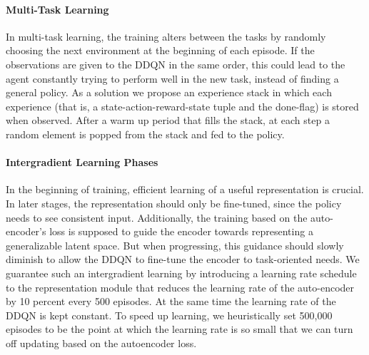 \paragraph{Multi-Task Learning} In multi-task learning, the training alters between the tasks by randomly choosing the next environment at the beginning of each episode. If the observations are given to the DDQN in the same order, this could lead to the agent constantly trying to perform well in the new task, instead of finding a general policy. As a solution we propose an experience stack in which each experience (that is, a state-action-reward-state tuple and the done-flag) is stored when observed. After a warm up period that fills the stack, at each step a random element is popped from the stack and fed to the policy.

\paragraph{Intergradient Learning Phases} In the beginning of training, efficient learning of a useful representation is crucial. In later stages, the representation should only be fine-tuned, since the policy needs to see consistent input. Additionally, the training based on the auto-encoder's loss is supposed to guide the encoder towards representing a generalizable latent space. But when progressing, this guidance should slowly diminish to allow the DDQN to fine-tune the encoder to task-oriented needs. We guarantee such an intergradient learning by introducing a learning rate schedule to the representation module that reduces the learning rate of the auto-encoder by 10 percent every 500 episodes. At the same time the learning rate of the DDQN is kept constant. To speed up learning, we heuristically set 500,000 episodes to be the point at which the learning rate is so small that we can turn off updating based on the autoencoder loss. 

